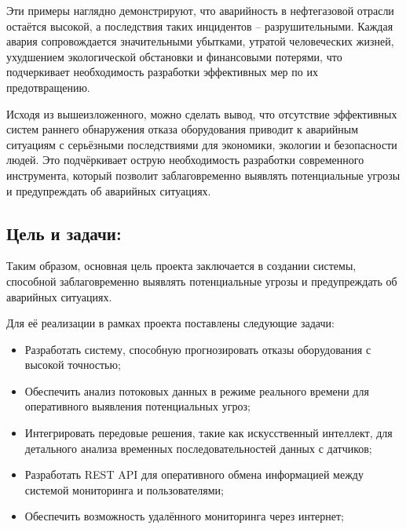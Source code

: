 \documentclass[a4paper,12pt]{article}
\begin{document}
\begin{flushleft}
Эти примеры наглядно демонстрируют, что аварийность в нефтегазовой отрасли остаётся высокой,
а последствия таких инцидентов – разрушительными.
Каждая авария сопровождается значительными убытками, утратой человеческих жизней, ухудшением экологической обстановки
и финансовыми потерями, что подчеркивает необходимость разработки эффективных мер по их предотвращению.

Исходя из вышеизложенного, можно сделать вывод, что отсутствие эффективных систем раннего
обнаружения отказа оборудования приводит к аварийным ситуациям с серьёзными последствиями
для экономики, экологии и безопасности людей.
Это подчёркивает острую необходимость разработки современного инструмента,
который позволит заблаговременно выявлять потенциальные угрозы и предупреждать об аварийных ситуациях.

\subsection{Цель и задачи: }

Таким образом, основная цель проекта заключается в создании системы,
способной заблаговременно выявлять потенциальные угрозы и предупреждать об аварийных ситуациях.

Для её реализации в рамках проекта поставлены следующие задачи:
\begin{itemize}
    \item Разработать систему, способную прогнозировать отказы оборудования с высокой точностью;
    \item Обеспечить анализ потоковых данных в режиме реального времени для оперативного выявления потенциальных угроз;
    \item Интегрировать передовые решения, такие как искусственный интеллект, для детального анализа временных последовательностей данных с датчиков;
    \item Разработать REST API для оперативного обмена информацией между системой мониторинга и пользователями;
    \item Обеспечить возможность удалённого мониторинга через интернет;
\end{itemize}
\end{flushleft}
\end{document}
